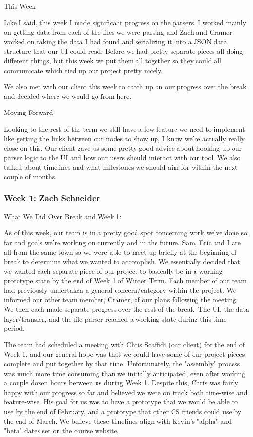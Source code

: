 This Week

Like I said, this week I made significant progress on the parsers. I worked mainly on getting data from each of the files we were parsing and Zach and Cramer worked on taking the data I had found and serializing it into a JSON data structure that our UI could read. Before we had pretty separate pieces all doing different things, but this week we put them all together so they could all communicate which tied up our project pretty nicely. 



We also met with our client this week to catch up on our progress over the break and decided where we would go from here.



Moving Forward

Looking to the rest of the term we still have a few feature we need to implement like getting the links between our nodes to show up, I know we're actually really close on this. Our client gave us some pretty good advice about hooking up our parser logic to the UI and how our users should interact with our tool. We also talked about timelines and what milestones we should aim for within the next couple of months. \\ 

 \subsubsection{Week 1: Zach Schneider}

What We Did Over Break and Week 1:

As of this week, our team is in a pretty good spot concerning work we've done so far and goals we're working on currently and in the future. Sam, Eric and I are all from the same town so we were able to meet up briefly at the beginning of break to determine what we wanted to accomplish. We essentially decided that we wanted each separate piece of our project to basically be in a working prototype state by the end of Week 1 of Winter Term. Each member of our team had previously undertaken a general concern/category within the project. We informed our other team member, Cramer, of our plans following the meeting. We then each made separate progress over the rest of the break. The UI, the data layer/transfer, and the file parser reached a working state during this time period.



The team had scheduled a meeting with Chris Scaffidi (our client) for the end of Week 1, and our general hope was that we could have some of our project pieces complete and put together by that time. Unfortunately, the "assembly" process was much more time consuming than we initially anticipated, even after working a couple dozen hours between us during Week 1. Despite this, Chris was fairly happy with our progress so far and believed we were on track both time-wise and feature-wise. His goal for us was to have a prototype that we would be able to use by the end of February, and a prototype that other CS friends could use by the end of March. We believe these timelines align with Kevin's "alpha" and "beta" dates set on the course website.



